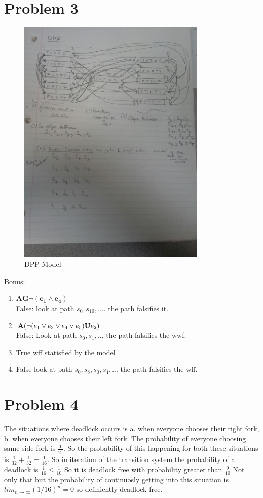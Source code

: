 \documentclass[11pt,leqno,fleqn]{article}
\begin{document}
\newpage
\section{Problem 3}
\begin{figure}[ht!]
\centering
\includegraphics[width=90mm]{dpp.jpg}
\caption{DPP Model}
\label{overflow}
\end{figure}

Bonus:
\begin{enumerate}[(1)]
\item  $\mathbf{AG \neg(e_1 \land e_4)}$\\
False: look at path $s_0, s_10, ....$ the path falsifies it.
\item $\mathbf{A}(\neg(e_1 \lor e_3 \lor e_4 \lor e_5) \bold{U} e_2) $\\
False: Look at path $s_0,s_1,..$, the path falsifies the wwf.
\item True wff statisfied by the model
\item False look at path $s_0,s_8,s_0,s_4,...$ the path falsifies the wff.
\end{enumerate}


\newpage
\section{Problem 4}
The situations where deadlock occurs is a. when everyone chooses their right fork, b. when everyone chooses their left fork.
The probability of everyone choosing same side fork is $\frac{1}{2^5}$. So the probability of this happening for both these situations is $\frac{1}{32} + \frac{1}{32} = \frac{1}{16}$. So in iteration of the transition system the probability of a deadlock is $\frac{1}{16} \leq \frac{1}{10}$ So it is deadlock free with probability greater than $\frac{9}{10}$ Not only that but the probability of continuosly getting into this situation is $lim_{n \to \infty} (1/16)^n = 0$ so definiently deadlock free.
\end{document}
